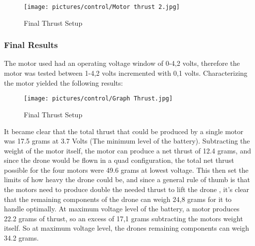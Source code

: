 \begin{figure}
    \texttt{[image: pictures/control/Motor thrust 2.jpg]}
    \caption{Final Thrust Setup}
    \label{fig:Final Thrust Setup}

\end{figure}

\subsubsection{Final Results}

The motor used had an operating voltage window of 0-4,2 volts, therefore the motor was tested between 1-4,2 volts incremented with 0,1 volts. 
Characterizing the motor yielded the following results:

\begin{figure}
    \texttt{[image: pictures/control/Graph Thrust.jpg]}
    \caption{Final Thrust Setup}
    \label{fig:Final Thrust Setup}

\end{figure}

It became clear that the total thrust that could be produced by a single motor was 17.5 grams at 3.7 Volts 
(The minimum level of the battery). Subtracting the weight of the motor itself, the motor can produce a net thrust of 12.4 grams, 
and since the drone would be flown in a quad configuration, the total net thrust possible for the four motors were 49.6 grams at lowest voltage. 
This then set the limits of how heavy the drone could be, and since a general rule of thumb is that the motors need to produce double the needed thrust to lift the drone , 
it’s clear that the remaining components of the drone can weigh 24,8 grams for it to handle optimally. At maximum voltage level of the battery, a motor produces 22.2 grams of thrust, 
so an excess of 17,1 grams subtracting the motors weight itself. So at maximum voltage level, the drones remaining components can weigh 34.2 grams.  



